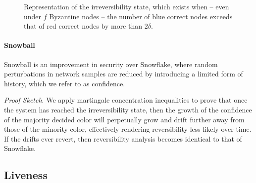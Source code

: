 \documentclass[letterpaper,twocolumn,10pt]{article}
\theoremstyle{definition}
\begin{document}
\begin{figure}[h]
\begin{center}

\caption{Representation of the irreversibility state, which exists when -- even under $f$ Byzantine nodes -- the number of blue correct nodes exceeds that of red correct nodes by more than $2\delta$.
}
\label{fig:states_feasible_solutions}
\end{center}
\end{figure}    


\paragraph{Snowball}
Snowball is an improvement in security over Snowflake, where random perturbations in network samples are reduced by introducing a limited form of history, which we refer to as confidence. 

\noindent \emph{Proof Sketch}. We apply martingale concentration inequalities to prove that once the system has reached the irreversibility state, then the growth of the confidence of the majority decided color will perpetually grow and drift further away from those of the minority color, effectively rendering reversibility less likely over time. If the drifts ever revert, then reversibility analysis becomes identical to that of Snowflake.  

\subsection{Liveness}
\end{document}
